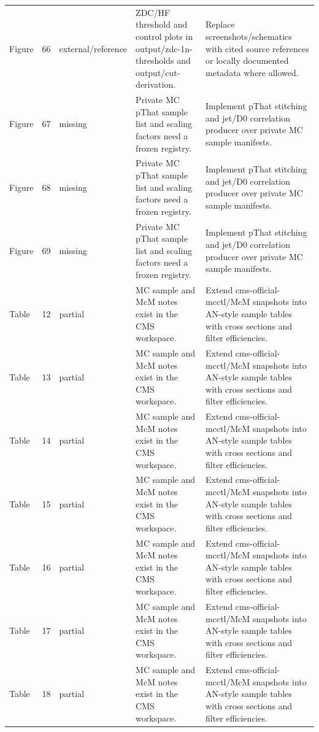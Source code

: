 \documentclass[11pt]{article}
\begin{document}
\begin{longtable}{lll p{} p{}}
Figure & 66 & external/reference & ZDC/HF threshold and control plots in output/zdc-1n-thresholds and output/cut-derivation. & Replace screenshots/schematics with cited source references or locally documented metadata where allowed. \\
Figure & 67 & missing & Private MC pThat sample list and scaling factors need a frozen registry. & Implement pThat stitching and jet/D0 correlation producer over private MC sample manifests. \\
Figure & 68 & missing & Private MC pThat sample list and scaling factors need a frozen registry. & Implement pThat stitching and jet/D0 correlation producer over private MC sample manifests. \\
Figure & 69 & missing & Private MC pThat sample list and scaling factors need a frozen registry. & Implement pThat stitching and jet/D0 correlation producer over private MC sample manifests. \\
Table & 12 & partial & MC sample and McM notes exist in the CMS workspace. & Extend cms-official-mcctl/McM snapshots into AN-style sample tables with cross sections and filter efficiencies. \\
Table & 13 & partial & MC sample and McM notes exist in the CMS workspace. & Extend cms-official-mcctl/McM snapshots into AN-style sample tables with cross sections and filter efficiencies. \\
Table & 14 & partial & MC sample and McM notes exist in the CMS workspace. & Extend cms-official-mcctl/McM snapshots into AN-style sample tables with cross sections and filter efficiencies. \\
Table & 15 & partial & MC sample and McM notes exist in the CMS workspace. & Extend cms-official-mcctl/McM snapshots into AN-style sample tables with cross sections and filter efficiencies. \\
Table & 16 & partial & MC sample and McM notes exist in the CMS workspace. & Extend cms-official-mcctl/McM snapshots into AN-style sample tables with cross sections and filter efficiencies. \\
Table & 17 & partial & MC sample and McM notes exist in the CMS workspace. & Extend cms-official-mcctl/McM snapshots into AN-style sample tables with cross sections and filter efficiencies. \\
Table & 18 & partial & MC sample and McM notes exist in the CMS workspace. & Extend cms-official-mcctl/McM snapshots into AN-style sample tables with cross sections and filter efficiencies. \\

\end{longtable}
\end{document}

